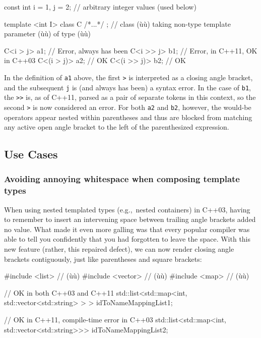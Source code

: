 \begin{emcppslisting}
const int i = 1, j = 2;  // arbitrary integer values (used below)

template <int I> class C { /*...*/ };
    // class (ù{}ù) taking non-type template parameter (ù{}ù) of type (ù{}ù)

C<i > j>    a1;  // Error, always has been
C<i >> j>   b1;  // Error, in C++11, OK in C++03
C<(i > j)>  a2;  // OK
C<(i >> j)> b2;  // OK
\end{emcppslisting}


\noindent In the definition of \lstinline!a1! above, the first \lstinline!>! is
interpreted as a closing angle bracket, and the subsequent \lstinline!j! is
(and always has been) a syntax error. In the case of \lstinline!b1!, the
\lstinline!>>! is, as of C++11, parsed as a pair of separate tokens in this
context, so the second \lstinline!>! is now considered an error. For
both \lstinline!a2! and \lstinline!b2!, however, the would-be operators appear
nested within parentheses and thus are blocked from matching any
active open angle bracket to the left of the parenthesized expression.

\subsection[Use Cases]{Use Cases}\label{use-cases}

\subsubsection[Avoiding annoying whitespace when composing template types]{Avoiding annoying whitespace when composing template types}\label{avoiding-annoying-whitespace-when-composing-template-types}

When using nested templated types (e.g.,~nested containers) in C++03,
having to remember to insert an intervening space between trailing angle
brackets added no value. What made it even more galling was that every
popular compiler was able to tell you confidently that you had forgotten
to leave the space. With this new
feature (rather, this repaired defect), we can now render closing angle
brackets contiguously, just like parentheses and square brackets:

\begin{emcppshiddenlisting}[emcppsbatch=e3]
#include <list>    // (ù{}ù)
#include <vector>  // (ù{}ù)
#include <map>     // (ù{}ù)
\end{emcppshiddenlisting}
\begin{emcppslisting}[emcppsbatch=e3]
// OK in both C++03 and C++11
std::list<std::map<int, std::vector<std::string> > > idToNameMappingList1;

// OK in C++11, compile-time error in C++03
std::list<std::map<int, std::vector<std::string>>>   idToNameMappingList2;
\end{emcppslisting}


